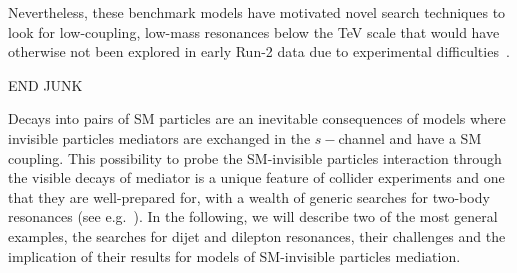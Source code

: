 
Nevertheless, these benchmark models have motivated novel search techniques
to look for low-coupling, low-mass resonances below the TeV scale that would
have otherwise not been explored in early Run-2 data due to experimental difficulties~\cite{An:2012ue,Dobrescu:2013coa}. 




END JUNK

Decays into pairs of SM particles are an inevitable consequences of models where
invisible particles mediators are exchanged in the $s-$channel and have a SM coupling. 
This possibility to probe the SM-invisible particles interaction through the visible 
decays of mediator is a unique feature of collider experiments
and one that they are well-prepared for, with a wealth of generic searches for
two-body resonances (see e.g.~\cite{Harris:2011bh}).
In the following, we will describe two of the most general examples,
the searches for dijet and dilepton resonances, their challenges and the implication of their results
for models of SM-invisible particles mediation. %

